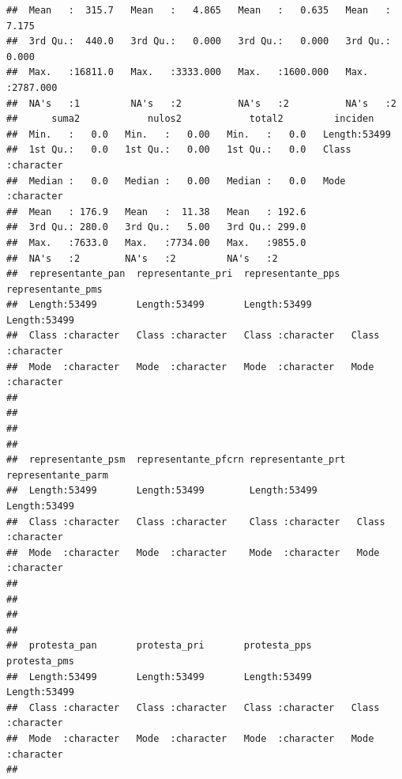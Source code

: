 \documentclass[
]{article}
\begin{document}
\begin{verbatim}
##  Mean   :  315.7   Mean   :   4.865   Mean   :   0.635   Mean   :   7.175  
##  3rd Qu.:  440.0   3rd Qu.:   0.000   3rd Qu.:   0.000   3rd Qu.:   0.000  
##  Max.   :16811.0   Max.   :3333.000   Max.   :1600.000   Max.   :2787.000  
##  NA's   :1         NA's   :2          NA's   :2          NA's   :2         
##      suma2            nulos2            total2         inciden         
##  Min.   :   0.0   Min.   :   0.00   Min.   :   0.0   Length:53499      
##  1st Qu.:   0.0   1st Qu.:   0.00   1st Qu.:   0.0   Class :character  
##  Median :   0.0   Median :   0.00   Median :   0.0   Mode  :character  
##  Mean   : 176.9   Mean   :  11.38   Mean   : 192.6                     
##  3rd Qu.: 280.0   3rd Qu.:   5.00   3rd Qu.: 299.0                     
##  Max.   :7633.0   Max.   :7734.00   Max.   :9855.0                     
##  NA's   :2        NA's   :2         NA's   :2                          
##  representante_pan  representante_pri  representante_pps  representante_pms 
##  Length:53499       Length:53499       Length:53499       Length:53499      
##  Class :character   Class :character   Class :character   Class :character  
##  Mode  :character   Mode  :character   Mode  :character   Mode  :character  
##                                                                             
##                                                                             
##                                                                             
##                                                                             
##  representante_psm  representante_pfcrn representante_prt  representante_parm
##  Length:53499       Length:53499        Length:53499       Length:53499      
##  Class :character   Class :character    Class :character   Class :character  
##  Mode  :character   Mode  :character    Mode  :character   Mode  :character  
##                                                                              
##                                                                              
##                                                                              
##                                                                              
##  protesta_pan       protesta_pri       protesta_pps       protesta_pms      
##  Length:53499       Length:53499       Length:53499       Length:53499      
##  Class :character   Class :character   Class :character   Class :character  
##  Mode  :character   Mode  :character   Mode  :character   Mode  :character  
##                                                                             

\end{verbatim}
\end{document}
